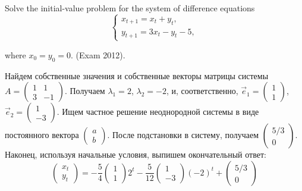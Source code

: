 \begin{problem}
Solve the initial-value problem for the system of difference equations
\[
\begin{cases}
x_{t+1} =x_{t} +y_{t} , \\
y_{t+1} =3x_{t} -y_{t} -5,
\end{cases}
\]

where $x_{0} =y_{0} =0$. (Exam 2012).


\begin{sol}
Найдем собственные значения и собственные векторы матрицы системы
$A=\begin{pmatrix}
1 & 1 \\
3 & -1
\end{pmatrix}$. Получаем  $\lambda_1=2$, $\lambda_2=-2$, и, соответственно,
$\vec{e}_1=\begin{pmatrix}
1 \\
1
\end{pmatrix}$,
$\vec{e}_2=\begin{pmatrix}
1 \\
-3
\end{pmatrix}$. Ищем частное решение неоднородной системы в виде постоянного вектора
$\begin{pmatrix}
a \\
b
\end{pmatrix}$.
После подстановки в систему, получаем
$\begin{pmatrix}
5/3 \\
0
\end{pmatrix}$.
Наконец, используя начальные условия, выпишем окончательный ответ:
\[
\begin{pmatrix}
x_t \\
y_t
\end{pmatrix} =
-\frac{5}{4}
\begin{pmatrix}
1 \\
1
\end{pmatrix}
2^t
-\frac{5}{12}
\begin{pmatrix}
1 \\
-3
\end{pmatrix}
(-2)^t
+\begin{pmatrix}
5/3 \\
0
\end{pmatrix}
\]
\begin{comment} %

\end{comment}
\end{sol}
\end{problem}
